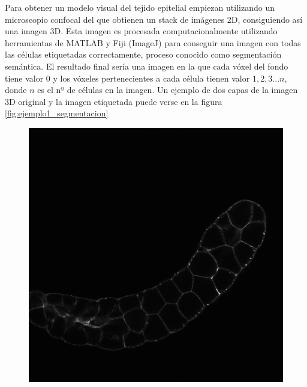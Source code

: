 Para obtener un modelo visual del tejido epitelial empiezan utilizando un microscopio confocal del que obtienen un stack de imágenes 2D, consiguiendo así una imagen 3D. Esta imagen es procesada computacionalmente utilizando herramientas de MATLAB y Fiji (ImageJ) para conseguir una imagen con todas las células etiquetadas correctamente, proceso conocido como segmentación semántica. El resultado final sería una imagen en la que cada vóxel del fondo tiene valor 0 y los vóxeles pertenecientes a cada célula tienen valor $1,2,3...n$, donde $n$ es el nº de células en la imagen. Un ejemplo de dos capas de la imagen 3D original y la imagen etiquetada puede verse en la figura \ref{fig:ejemplo1_segmentacion}

\begin{figure}[ht]
\centering
\includegraphics[scale=0.18]{img/raw 04_1a Z=77.png}
\vspace*{1mm}

\end{figure}

